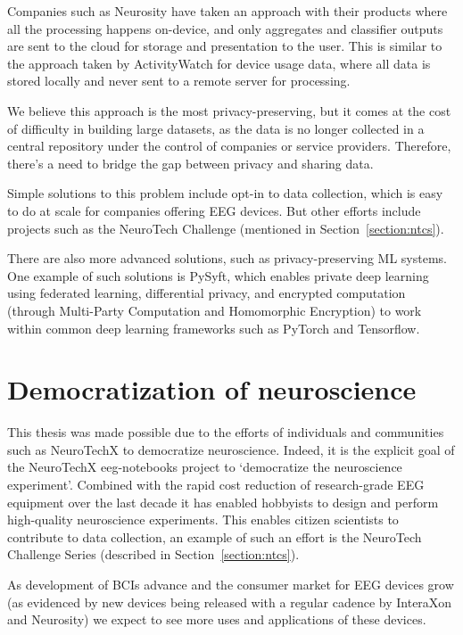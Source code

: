     Companies such as Neurosity have taken an approach with their products where all the processing happens on-device, and only aggregates and classifier outputs are sent to the cloud for storage and presentation to the user. This is similar to the approach taken by ActivityWatch for device usage data, where all data is stored locally and never sent to a remote server for processing. 

    We believe this approach is the most privacy-preserving, but it comes at the cost of difficulty in building large datasets, as the data is no longer collected in a central repository under the control of companies or service providers. Therefore, there's a need to bridge the gap between privacy and sharing data.

    Simple solutions to this problem include opt-in to data collection, which is easy to do at scale for companies offering EEG devices. But other efforts include projects such as the NeuroTech Challenge (mentioned in Section~\ref{section:ntcs}).

    There are also more advanced solutions, such as privacy-preserving ML systems. One example of such solutions is PySyft, which enables private deep learning using federated learning, differential privacy, and encrypted computation (through Multi-Party Computation and Homomorphic Encryption) to work within common deep learning frameworks such as PyTorch and Tensorflow.

\section{Democratization of neuroscience}

    This thesis was made possible due to the efforts of individuals and communities such as NeuroTechX to democratize neuroscience. Indeed, it is the explicit goal of the NeuroTechX eeg-notebooks project to `democratize the neuroscience experiment'. Combined with the rapid cost reduction of research-grade EEG equipment over the last decade it has enabled hobbyists to design and perform high-quality neuroscience experiments. This enables citizen scientists to contribute to data collection, an example of such an effort is the NeuroTech Challenge Series (described in Section~\ref{section:ntcs}).

    As development of BCIs advance and the consumer market for EEG devices grow (as evidenced by new devices being released with a regular cadence by InteraXon and Neurosity) we expect to see more uses and applications of these devices.

